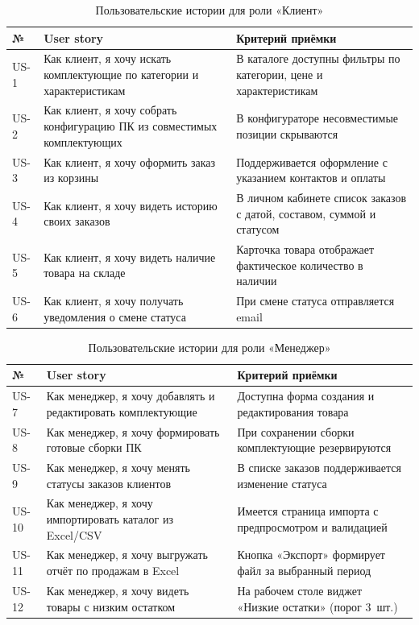 \documentclass[14pt, a4paper]{extarticle}
\begin{document}
\begin{table}[ht!]
\caption{Пользовательские истории для роли «Клиент»}
\label{tab:us-cli}
\small
\begin{tabularx}{\textwidth}{|>{\centering\arraybackslash}p{}|>{\RaggedRight\arraybackslash}X|>{\RaggedRight\arraybackslash}X|}
\hline
\textbf{№} & \textbf{User story} & \textbf{Критерий приёмки} \\ \hline
US-1 & Как клиент, я хочу искать комплектующие по категории и характеристикам & В каталоге доступны фильтры по категории, цене и характеристикам \\ \hline
US-2 & Как клиент, я хочу собрать конфигурацию ПК из совместимых комплектующих & В конфигураторе несовместимые позиции скрываются \\ \hline
US-3 & Как клиент, я хочу оформить заказ из корзины & Поддерживается оформление с указанием контактов и оплаты \\ \hline
US-4 & Как клиент, я хочу видеть историю своих заказов & В личном кабинете список заказов с датой, составом, суммой и статусом \\ \hline
US-5 & Как клиент, я хочу видеть наличие товара на складе & Карточка товара отображает фактическое количество в наличии \\ \hline
US-6 & Как клиент, я хочу получать уведомления о смене статуса & При смене статуса отправляется email \\ \hline
\end{tabularx}
\end{table}

\begin{table}[ht!]
\caption{Пользовательские истории для роли «Менеджер»}
\label{tab:us-mgr}
\small
\begin{tabularx}{\textwidth}{|>{\centering\arraybackslash}p{}|>{\RaggedRight\arraybackslash}X|>{\RaggedRight\arraybackslash}X|}
\hline
\textbf{№} & \textbf{User story} & \textbf{Критерий приёмки} \\ \hline
US-7 & Как менеджер, я хочу добавлять и редактировать комплектующие & Доступна форма создания и редактирования товара \\ \hline
US-8 & Как менеджер, я хочу формировать готовые сборки ПК & При сохранении сборки комплектующие резервируются \\ \hline
US-9 & Как менеджер, я хочу менять статусы заказов клиентов & В списке заказов поддерживается изменение статуса \\ \hline
US-10 & Как менеджер, я хочу импортировать каталог из Excel/CSV & Имеется страница импорта с предпросмотром и валидацией \\ \hline
US-11 & Как менеджер, я хочу выгружать отчёт по продажам в Excel & Кнопка «Экспорт» формирует файл за выбранный период \\ \hline
US-12 & Как менеджер, я хочу видеть товары с низким остатком & На рабочем столе виджет «Низкие остатки» (порог 3~шт.) \\ \hline
\end{tabularx}
\end{table}
\end{document}
